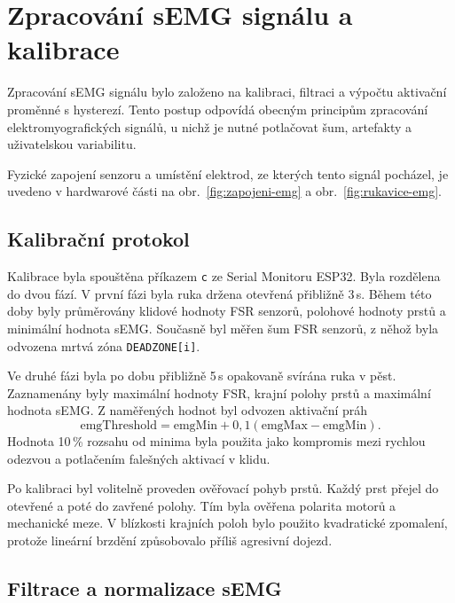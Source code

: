 \section{Zpracování sEMG signálu a kalibrace}
\label{sec:semg-zpracovani}

Zpracování sEMG signálu bylo založeno na kalibraci, filtraci a výpočtu aktivační proměnné s hysterezí. Tento postup odpovídá obecným principům zpracování elektromyografických signálů, u nichž je nutné potlačovat šum, artefakty a uživatelskou variabilitu.

Fyzické zapojení senzoru a umístění elektrod, ze kterých tento signál pocházel, je uvedeno v hardwarové části na obr.~\ref{fig:zapojeni-emg} a obr.~\ref{fig:rukavice-emg}.

\subsection{Kalibrační protokol}
\label{subsec:kalibracni-protokol}

Kalibrace byla spouštěna příkazem \texttt{c} ze Serial Monitoru ESP32. Byla rozdělena do dvou fází. V první fázi byla ruka držena otevřená přibližně 3\,s. Během této doby byly průměrovány klidové hodnoty FSR senzorů, polohové hodnoty prstů a minimální hodnota sEMG\@. Současně byl měřen šum FSR senzorů, z něhož byla odvozena mrtvá zóna \texttt{DEADZONE[i]}.

Ve druhé fázi byla po dobu přibližně 5\,s opakovaně svírána ruka v pěst. Zaznamenány byly maximální hodnoty FSR, krajní polohy prstů a maximální hodnota sEMG\@. Z naměřených hodnot byl odvozen aktivační práh
\begin{equation}
    \mathrm{emgThreshold} =
    \mathrm{emgMin} + 0{,}1\left(\mathrm{emgMax} - \mathrm{emgMin}\right).
\end{equation}
Hodnota 10\,\% rozsahu od minima byla použita jako kompromis mezi rychlou odezvou a potlačením falešných aktivací v klidu.

Po kalibraci byl volitelně proveden ověřovací pohyb prstů. Každý prst přejel do otevřené a poté do zavřené polohy. Tím byla ověřena polarita motorů a mechanické meze. V blízkosti krajních poloh bylo použito kvadratické zpomalení, protože lineární brzdění způsobovalo příliš agresivní dojezd.

\subsection{Filtrace a normalizace sEMG}
\label{subsec:filtrace-semgg}

